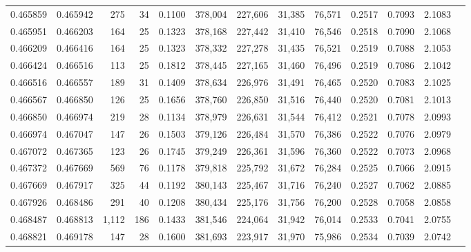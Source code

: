 \begin{tabular}{rrrrrrrrrrrrr}
0.465859 & 0.465942 &   275 &  34 &                                     0.1100 & 378,004 & 227,606 &  31,385 &  76,571 & 0.2517 & 0.7093 & 2.1083 \\
0.465951 & 0.466203 &   164 &  25 &                                     0.1323 & 378,168 & 227,442 &  31,410 &  76,546 & 0.2518 & 0.7090 & 2.1068 \\
0.466209 & 0.466416 &   164 &  25 &                                     0.1323 & 378,332 & 227,278 &  31,435 &  76,521 & 0.2519 & 0.7088 & 2.1053 \\
0.466424 & 0.466516 &   113 &  25 &                                     0.1812 & 378,445 & 227,165 &  31,460 &  76,496 & 0.2519 & 0.7086 & 2.1042 \\
0.466516 & 0.466557 &   189 &  31 &                                     0.1409 & 378,634 & 226,976 &  31,491 &  76,465 & 0.2520 & 0.7083 & 2.1025 \\
0.466567 & 0.466850 &   126 &  25 &                                     0.1656 & 378,760 & 226,850 &  31,516 &  76,440 & 0.2520 & 0.7081 & 2.1013 \\
0.466850 & 0.466974 &   219 &  28 &                                     0.1134 & 378,979 & 226,631 &  31,544 &  76,412 & 0.2521 & 0.7078 & 2.0993 \\
0.466974 & 0.467047 &   147 &  26 &                                     0.1503 & 379,126 & 226,484 &  31,570 &  76,386 & 0.2522 & 0.7076 & 2.0979 \\
0.467072 & 0.467365 &   123 &  26 &                                     0.1745 & 379,249 & 226,361 &  31,596 &  76,360 & 0.2522 & 0.7073 & 2.0968 \\
0.467372 & 0.467669 &   569 &  76 &                                     0.1178 & 379,818 & 225,792 &  31,672 &  76,284 & 0.2525 & 0.7066 & 2.0915 \\
0.467669 & 0.467917 &   325 &  44 &                                     0.1192 & 380,143 & 225,467 &  31,716 &  76,240 & 0.2527 & 0.7062 & 2.0885 \\
0.467926 & 0.468486 &   291 &  40 &                                     0.1208 & 380,434 & 225,176 &  31,756 &  76,200 & 0.2528 & 0.7058 & 2.0858 \\
0.468487 & 0.468813 & 1,112 & 186 &                                     0.1433 & 381,546 & 224,064 &  31,942 &  76,014 & 0.2533 & 0.7041 & 2.0755 \\
0.468821 & 0.469178 &   147 &  28 &                                     0.1600 & 381,693 & 223,917 &  31,970 &  75,986 & 0.2534 & 0.7039 & 2.0742 \\

\end{tabular}

